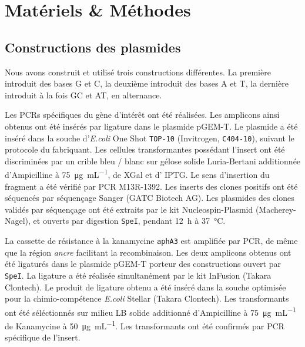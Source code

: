 \section{Matériels \& Méthodes}
\label{sec:materiel}

\subsection{Constructions des plasmides}
\label{subsec:constructions}


Nous avons construit et utilisé trois constructions différentes. La première
introduit des bases G et C, la deuxième introduit des bases A et T, la dernière
introduit à la fois GC et AT, en alternance.


Les PCRs spécifiques du gène d'intérêt ont été réalisées. Les amplicons ainsi
obtenus ont été insérés par ligature dans le plasmide pGEM-T. Le plasmide a été
inséré dans la souche d'\textit{E.coli} One Shot\textsuperscript{{\textregistered}}
\texttt{TOP-10} (Invitrogen, \texttt{C404-10}), suivant le protocole du
fabriquant. Les cellules transformantes possédant l'insert ont été discriminées
par un crible bleu / blanc sur gélose solide Luria-Bertani additionnée
d'Ampicilline à \SI{75}{\ug\per\mL}, de XGal et d' IPTG. Le sens d'insertion du
fragment a été vérifié par PCR M13R-1392. Les inserts des clones positifs ont
été séquencés par séquençage Sanger (GATC Biotech AG). Les plasmides des clones
validés par séquençage ont été extraits par le kit Nucleospin-Plasmid
(Macherey-Nagel), et ouverts par digestion \texttt{SpeI}, pendant \si{12\hour} à
\si{37\celsius}.

La cassette de résistance à la kanamycine \texttt{aphA3} est amplifiée par PCR,
de même que la région \emph{ancre} facilitant la recombinaison. Les deux
amplicons obtenus ont été ligaturés dans le plasmide pGEM-T porteur des
constructions ouvert par \texttt{SpeI}. La ligature a été réalisée simultanément
par le kit InFusion (Takara Clontech). Le produit de ligature obtenu a été
inséré dans la souche optimisée pour la chimio-compétence \emph{E.coli} Stellar
(Takara Clontech). Les transformants ont été séléctionnés sur milieu LB solide
additionné d'Ampicilline à \SI{75}{\ug\per\mL} de Kanamycine à
\SI{50}{\ug\per\mL}. Les transformants ont été confirmés par PCR spécifique de
l'insert.

